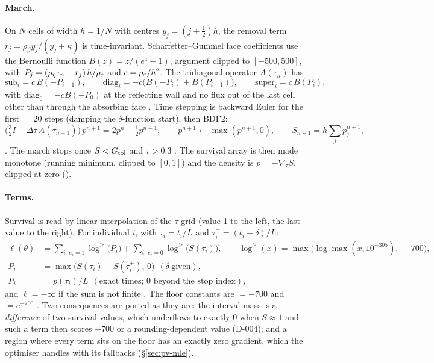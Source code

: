 \paragraph{March.} On $N$ cells of width $h=1/N$ with centres $y_j=(j+\tfrac12)h$, the removal term
$r_j=\rho_\beta y_j/(y_j+\kappa)$ is time-invariant. Scharfetter--Gummel face coefficients use the
Bernoulli function $B(z)=z/(e^z-1)$, argument clipped to $[-500,500]$, with
$P_j=(\rho_\eta\tau_n-r_j)\,h/\rho_\varepsilon$ and $c=\rho_\varepsilon/h^2$. The tridiagonal operator $A(\tau_n)$ has
\begin{equation}
  \text{sub}_i=c\,B(-P_{i-1}),\qquad \text{diag}_i=-c\big(B(-P_i)+B(P_{i-1})\big),\qquad \text{super}_i=c\,B(P_i),
\end{equation}
with $\text{diag}_0=-cB(-P_0)$ at the reflecting wall and no flux out of the last cell other than through the
absorbing face . Time stepping is backward Euler for the first
$=20$ steps (damping the $\delta$-function start), then BDF2:
\begin{equation}
  \big(\tfrac32 I-\Delta\tau\,A(\tau_{n+1})\big)\,p^{n+1}=2p^n-\tfrac12p^{n-1},
  \qquad p^{n+1}\leftarrow\max(p^{n+1},0),\qquad S_{n+1}=h\sum_jp^{n+1}_j,
\end{equation}
. The march stops once $S<G_{\rm tol}$ and $\tau>0.3$
. The survival array is then made monotone (running minimum, clipped to
$[0,1]$) and the density is $p=-\nabla_\tau S$, clipped at zero 
().

\paragraph{Terms.} Survival is read by linear interpolation of the $\tau$ grid (value 1 to the left, the
last value to the right). For individual $i$, with $\tau_i=t_i/L$ and $\tau_i^+=(t_i+\delta)/L$:
\begin{align}
  \ell(\theta)&=\sum_{i:\,e_i=1}\log^{\ge}\!\big(P_i\big)+\sum_{i:\,e_i=0}\log^{\ge}\!\big(S(\tau_i)\big),\qquad
  \log^{\ge}(x)=\max\!\big(\log\max(x,10^{-305}),\,-700\big),\\
  P_i&=\max\big(S(\tau_i)-S(\tau_i^+),\,0\big)\ \ (\delta\ \text{given}),\\
  P_i&=p(\tau_i)/L\ \ (\text{exact times; }0\text{ beyond the stop index}),
\end{align}
and $\ell=-\infty$ if the sum is not finite . The floor constants are
$=-700$ and $=e^{-700}$ . Two consequences
are ported as they are: the interval mass is a \emph{difference} of two survival values, which underflows to
exactly $0$ when $S\approx1$ and such a term then scores $-700$ or a rounding-dependent value (D-004); and a
region where every term sits on the floor has an exactly zero gradient, which the optimiser handles with its
fallbacks (\S\ref{sec:pv-mle}).

